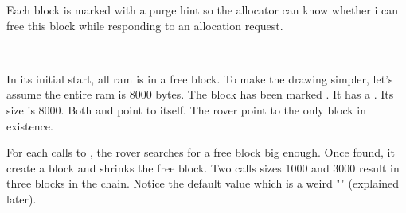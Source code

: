 Each block is marked with a purge hint so the allocator can know whether i can free this block while responding to an allocation request.\\
\par
{}\\
\par
In its initial start, all ram is in a free block. To make the drawing simpler, let's assume the entire ram is 8000 bytes. The block has been marked . It has a  . Its size is 8000. Both  and  point to itself. The rover point to the only block in existence.\\
\par
{}
\par
For each calls to , the rover searches for a free block big enough. Once found, it create a block and shrinks the free block. Two calls sizes 1000 and 3000 result in three blocks in the chain. Notice the default  value which is a weird "" (explained later).\\
\par
{}


